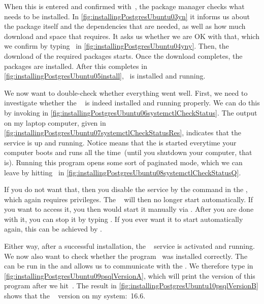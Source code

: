 When this is entered and confirmed with~\keys{\return}, the package manager checks what needs to be installed.
In \cref{fig:installingPostgresUbuntu03yn} it informs us about the package itself and the dependencies that are needed, as well as how much download and space that requires.
It asks us whether we are OK with that, which we confirm by typing~ in \cref{fig:installingPostgresUbuntu04yny}.
Then, the download of the required packages starts.
Once the download completes, the packages are installed.
After this completes in \cref{fig:installingPostgresUbuntu05install}, \postgresql\ is installed and running.

We now want to double-check whether everything went well.
First, we need to investigate whether the \postgresql\   is indeed installed and running properly.
We can do this by invoking  in \cref{fig:installingPostgresUbuntu06systemctlCheckStatus}.
The output on my laptop computer, given in \cref{fig:installingPostgresUbuntu07systemctlCheckStatusRes}, indicates that the service is up and running.
Notice  means that the  is started everytime your computer boots and runs all the time~(until you shutdown your computer, that is).
Running this program opens some sort of paginated mode, which we can leave by hitting~ in \cref{fig:installingPostgresUbuntu08systemctlCheckStatusQ}.%
%
\begin{sloppypar}%
If you do not want that, then you disable the service by the command  in the , which again requires  privileges.
The \postgresql\  will then no longer start automatically.
If you want to access it, you then would start it manually via .
After you are done with it, you can stop it by typing .
If you ever want it to start automatically again, this can be achieved by .%
\end{sloppypar}%
%
Either way, after a successful installation, the \postgresql\  service is activated and running.
We now also want to check whether the  program \psql\ was installed correctly.
The  can be run in the  and allows us to communicate with the  .
We therefore type  in \cref{fig:installingPostgresUbuntu09psqlVersionA}, which will print the version of this program after we hit~\keys{\return}.
The result in \cref{fig:installingPostgresUbuntu10psqlVersionB} shows that the \psql\  version on my system:~16.6.

